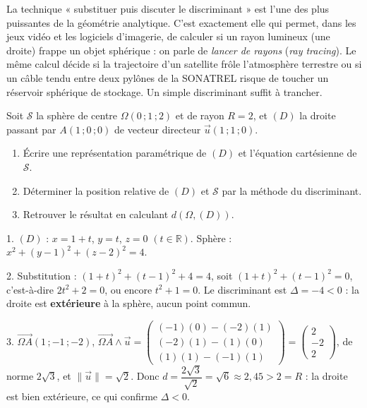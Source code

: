 \documentclass[11pt]{article}
\begin{document}
\begin{savaistu}
La technique « substituer puis discuter le discriminant » est l'une des plus puissantes de la géométrie analytique. C'est exactement elle qui permet, dans les jeux vidéo et les logiciels d'imagerie, de calculer si un rayon lumineux (une droite) frappe un objet sphérique : on parle de \emph{lancer de rayons} (\emph{ray tracing}). Le même calcul décide si la trajectoire d'un satellite frôle l'atmosphère terrestre ou si un câble tendu entre deux pylônes de la SONATREL risque de toucher un réservoir sphérique de stockage. Un simple discriminant suffit à trancher.
\end{savaistu}

\begin{exercice}
Soit $\mathcal{S}$ la sphère de centre $\Omega(0\,;1\,;2)$ et de rayon $R=2$, et $(D)$ la droite passant par $A(1\,;0\,;0)$ de vecteur directeur $\vec{u}(1\,;1\,;0)$.
\begin{enumerate}
\item Écrire une représentation paramétrique de $(D)$ et l'équation cartésienne de $\mathcal{S}$.
\item Déterminer la position relative de $(D)$ et $\mathcal{S}$ par la méthode du discriminant.
\item Retrouver le résultat en calculant $d(\Omega,(D))$.
\end{enumerate}
\end{exercice}

\begin{corrige}[Exercice 1]
1. $(D)$ : $x=1+t$, $y=t$, $z=0$ $(t\in\mathbb{R})$. Sphère : $x^2+(y-1)^2+(z-2)^2=4$.

2. Substitution : $(1+t)^2+(t-1)^2+4=4$, soit $(1+t)^2+(t-1)^2=0$, c'est-à-dire $2t^2+2=0$, ou encore $t^2+1=0$. Le discriminant est $\Delta=-4<0$ : la droite est \textbf{extérieure} à la sphère, aucun point commun.

3. $\overrightarrow{\Omega A}(1\,;-1\,;-2)$, $\overrightarrow{\Omega A}\wedge\vec{u}=\begin{pmatrix} (-1)(0)-(-2)(1) \\ (-2)(1)-(1)(0) \\ (1)(1)-(-1)(1) \end{pmatrix}=\begin{pmatrix} 2 \\ -2 \\ 2 \end{pmatrix}$, de norme $2\sqrt{3}$, et $\|\vec{u}\|=\sqrt{2}$. Donc $d=\dfrac{2\sqrt{3}}{\sqrt{2}}=\sqrt{6}\approx 2{,}45>2=R$ : la droite est bien extérieure, ce qui confirme $\Delta<0$.
\end{corrige}
\end{document}
